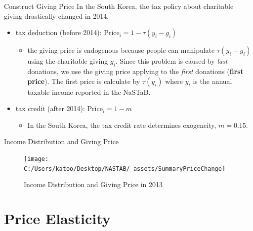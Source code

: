 \documentclass[
  ignorenonframetext,
]{beamer}
\providecommand{\tightlist}{%
  \setlength{\itemsep}{0pt}\setlength{\parskip}{0pt}}
\begin{document}
\begin{frame}{Construct Giving Price}
\protect\hypertarget{construct-giving-price}{}
In the South Korea, the tax policy about charitable giving drastically changed in 2014.

\begin{itemize}
\tightlist
\item
  tax deduction (before 2014): \(\text{Price}_i = 1 - \tau(y_i - g_i)\)

  \begin{itemize}
  \tightlist
  \item
    the giving price is endogenous because people can manipulate \(\tau(y_i - g_i)\) using the charitable giving \(g_i\). Since this problem is caused by \emph{last} donations, we use the giving price applying to the \emph{first} donations (\textbf{first price}). The first price is calculate by \(\tau(y_i)\) where \(y_i\) is the annual taxable income reported in the NaSTaB.
  \end{itemize}
\item
  tax credit (after 2014): \(\text{Price}_i = 1 - m\)

  \begin{itemize}
  \tightlist
  \item
    In the South Korea, the tax credit rate determines exogeneity, \(m = 0.15\).
  \end{itemize}
\end{itemize}
\end{frame}

\begin{frame}{Income Distribution and Giving Price}
\protect\hypertarget{income-distribution-and-giving-price}{}
\begin{figure}
\texttt{[image: C:/Users/katoo/Desktop/NASTAB/\_assets/SummaryPriceChange]} \caption{Income Distribution and Giving Price in 2013}\label{fig:unnamed-chunk-2}
\end{figure}
\end{frame}

\hypertarget{price-elasticity}{%
\section{Price Elasticity}\label{price-elasticity}}
\end{document}
